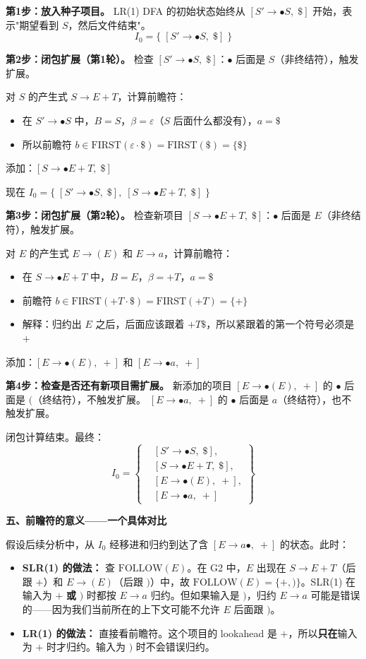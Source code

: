\documentclass[12pt,a4paper,fontset=fandol]{ctexart}
\begin{document}
\textbf{第1步：放入种子项目。}
LR(1) DFA 的初始状态始终从 $[S' \to \bullet S,\; \$]$ 开始，表示"期望看到 $S$，然后文件结束"。
\[
I_0 = \{\; [S' \to \bullet S,\; \$] \;\}
\]

\textbf{第2步：闭包扩展（第1轮）。}
检查 $[S' \to \bullet S,\; \$]$：$\bullet$ 后面是 $S$（非终结符），触发扩展。

对 $S$ 的产生式 $S \to E + T$，计算前瞻符：
\begin{itemize}
    \item 在 $S' \to \bullet S$ 中，$B = S$，$\beta = \varepsilon$（$S$ 后面什么都没有），$a = \$$
    \item 所以前瞻符 $b \in \text{FIRST}(\varepsilon \cdot \$) = \text{FIRST}(\$) = \{\$\}$
\end{itemize}
添加：$[S \to \bullet E + T,\; \$]$

现在 $I_0 = \{\; [S' \to \bullet S,\; \$],\; [S \to \bullet E + T,\; \$] \;\}$

\textbf{第3步：闭包扩展（第2轮）。}
检查新项目 $[S \to \bullet E + T,\; \$]$：$\bullet$ 后面是 $E$（非终结符），触发扩展。

对 $E$ 的产生式 $E \to (E)$ 和 $E \to a$，计算前瞻符：
\begin{itemize}
    \item 在 $S \to \bullet E + T$ 中，$B = E$，$\beta = +T$，$a = \$$
    \item 前瞻符 $b \in \text{FIRST}(+T \cdot \$) = \text{FIRST}(+T) = \{+\}$
    \item 解释：归约出 $E$ 之后，后面应该跟着 $+T\$ $，所以紧跟着的第一个符号必须是 $+$
\end{itemize}
添加：$[E \to \bullet (E),\; +]$ 和 $[E \to \bullet a,\; +]$

\textbf{第4步：检查是否还有新项目需扩展。}
新添加的项目 $[E \to \bullet (E),\; +]$ 的 $\bullet$ 后面是 $($（终结符），不触发扩展。
$[E \to \bullet a,\; +]$ 的 $\bullet$ 后面是 $a$（终结符），也不触发扩展。

闭包计算结束。最终：
\[
\boxed{
I_0 = \left\{
\begin{aligned}
&[S' \to \bullet S,\; \$],\\
&[S  \to \bullet E + T,\; \$],\\
&[E  \to \bullet (E),\; +],\\
&[E  \to \bullet a,\; +]
\end{aligned}
\right\}
}
\]

\textbf{五、前瞻符的意义——一个具体对比}

假设后续分析中，从 $I_0$ 经移进和归约到达了含 $[E \to a\bullet,\; +]$ 的状态。此时：
\begin{itemize}
    \item \textbf{SLR(1) 的做法：} 查 $\text{FOLLOW}(E)$。在 G2 中，$E$ 出现在 $S \to E+T$（后跟 $+$）和 $E \to (E)$（后跟 $)$）中，故 $\text{FOLLOW}(E) = \{+, )\}$。SLR(1) 在输入为 $+$ \textbf{或} $)$ 时都按 $E \to a$ 归约。但如果输入是 $)$，归约 $E \to a$ 可能是错误的——因为我们当前所在的上下文可能不允许 $E$ 后面跟 $)$。
    \item \textbf{LR(1) 的做法：} 直接看前瞻符。这个项目的 lookahead 是 $+$，所以\textbf{只在}输入为 $+$ 时才归约。输入为 $)$ 时不会错误归约。
\end{itemize}
\end{document}
